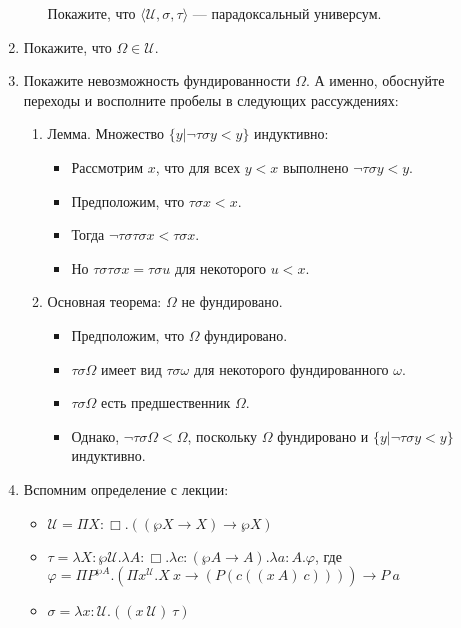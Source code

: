 \documentclass[10pt,a4paper,oneside]{article}
\begin{document}
\begin{enumerate}
\begin{enumerate}
Покажите, что $\langle \mathcal{U}, \sigma, \tau\rangle$ --- парадоксальный универсум.
\end{enumerate}
\item Покажите, что $\Omega\in\mathcal{U}$.
\item Покажите невозможность фундированности $\Omega$. А именно, обоснуйте переходы и восполните пробелы в следующих рассуждениях:
\begin{enumerate}
\item Лемма. Множество $\{y | \neg\tau\sigma y < y \}$ индуктивно:
\begin{itemize}
\item Рассмотрим $x$, что для всех $y < x$ выполнено $\neg \tau\sigma y < y$.
\item Предположим, что $\tau\sigma x < x$. 
\item Тогда $\neg \tau\sigma\tau\sigma x < \tau\sigma x$.
\item Но $\tau\sigma\tau\sigma x = \tau\sigma u$ для некоторого $u < x$.
\end{itemize}
\item Основная теорема: $\Omega$ не фундировано.
\begin{itemize}
\item Предположим, что $\Omega$ фундировано.
\item $\tau\sigma\Omega$ имеет вид $\tau\sigma\omega$ для некоторого фундированного $\omega$.
\item $\tau\sigma\Omega$ есть предшественник $\Omega$.
\item Однако, $\neg \tau\sigma \Omega < \Omega$, поскольку $\Omega$ фундировано и $\{y | \neg\tau\sigma y < y \}$ индуктивно.
\end{itemize}
\end{enumerate}
\item Вспомним определение с лекции:
\begin{itemize}
\item $\mathcal{U} = \Pi X : \Box . ((\wp X \rightarrow X) \rightarrow \wp X)$
\item $\tau = \lambda X : \wp\mathcal{U}. \lambda A : \Box.\lambda c : (\wp A \rightarrow A).\lambda a : A.\varphi$, где
 $\varphi = \Pi P^{\wp A}.(\Pi x^\mathcal{U}.X\ x\rightarrow (P (c ((x\ A)\ c)))) \rightarrow P\ a$

\item $\sigma = \lambda x : \mathcal{U} . ((x\ \mathcal{U})\ \tau)$
\end{itemize}


\end{enumerate}
\end{document}
